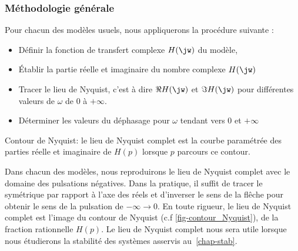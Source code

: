 \subsubsection{Méthodologie générale}
Pour chacun des modèles usuels, nous appliquerons la procédure suivante :
\begin{itemize}
    \item Définir la fonction de transfert complexe $H(\jw)$ du modèle,
    \item \'Etablir la partie réelle et imaginaire du nombre complexe $H(\jw)$
    \item Tracer le lieu de Nyquist, c'est à dire $\Re{H(\jw)}$ et 
          $\Im{H(\jw)}$ pour différentes valeurs de $\omega$ de 0 à $+\infty$. 
    \item Déterminer les valeurs du déphasage pour $\omega$ tendant vers 0 et 
          $+\infty$ 
\end{itemize}
\begin{marginfigure}
    \centering
    
    \caption{Contour de Nyquist: le lieu de Nyquist complet est 
             la courbe paramétrée des parties réelle et imaginaire 
             de $H(p)$ lorsque $p$ parcours ce contour.
             \label{fig-contour_Nyquist}}
\end{marginfigure}
Dans chacun des modèles, nous reproduirons le lieu de Nyquist 
complet avec le domaine des pulsations négatives. Dans la pratique, il suffit 
de tracer le symétrique par rapport à 
l'axe des réels et d'inverser le sens de la flêche pour obtenir le sens de la 
pulsation de $-\infty\to 0$. 
En toute rigueur, le lieu de Nyquist complet est l'image du contour de Nyquist
(c.f \cref{fig-contour_Nyquist}), de la fraction rationnelle $H(p)$. 
Le lieu de Nyquist complet nous sera utile lorsque nous étudierons la stabilité
des systèmes asservis au~\cref{chap-stab}.    
